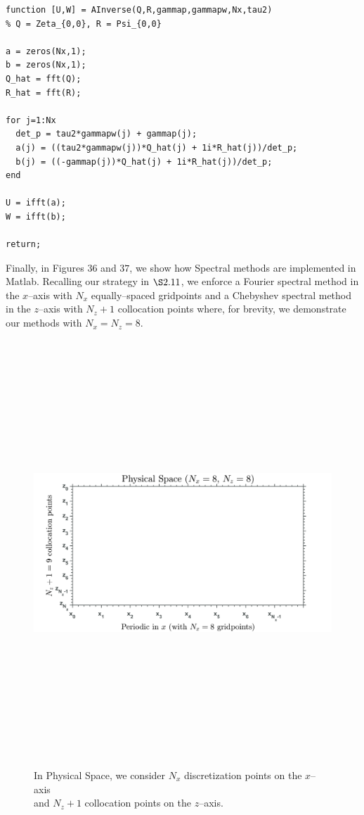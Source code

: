 \begin{lstlisting}[caption={Inversion of Flat--Interface $\bA_{0,0}$},frame=single]
function [U,W] = AInverse(Q,R,gammap,gammapw,Nx,tau2)
% Q = Zeta_{0,0}, R = Psi_{0,0}
  
a = zeros(Nx,1);
b = zeros(Nx,1);
Q_hat = fft(Q);
R_hat = fft(R);

for j=1:Nx
  det_p = tau2*gammapw(j) + gammap(j);
  a(j) = ((tau2*gammapw(j))*Q_hat(j) + 1i*R_hat(j))/det_p;
  b(j) = ((-gammap(j))*Q_hat(j) + 1i*R_hat(j))/det_p;
end

U = ifft(a);
W = ifft(b);

return;
\end{lstlisting}
\vspace{2mm}
Finally, in Figures $36$ and $37$, we show how Spectral methods are implemented in Matlab. Recalling our strategy in $\S 2.11$, we enforce a Fourier spectral method in the $x$--axis with $N_x$ equally--spaced gridpoints and a Chebyshev spectral method in the $z$--axis with $N_z + 1$ collocation points where, for brevity, we demonstrate our methods with $N_x=N_z=8$.
\vspace{-16mm}
\begin{figure}[H]
    \centering
    \includegraphics[width=16cm,height=16cm,keepaspectratio]{sections/other/matt_1.png}%
    \vspace{1mm}
    \caption{In Physical Space, we consider $N_x$ discretization points on the $x$--axis \\and $N_z+1$ collocation points on the $z$--axis.}%
    \label{fig:physical_space}%
\end{figure}


